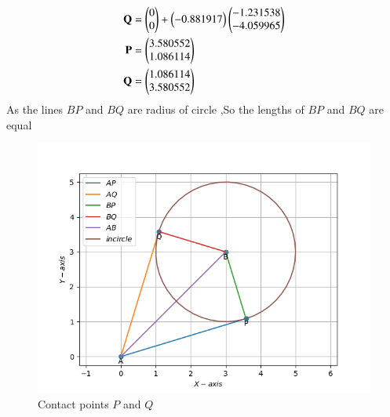\begin{enumerate}[label=\thesection.\arabic*,ref=\thesection.\theenumi]
\begin{enumerate}
\begin{align}
		\mathbf{Q} &=\begin{pmatrix}0 \\0\end{pmatrix}+\begin{pmatrix}-0.881917\end{pmatrix}\begin{pmatrix}-1.231538 \\ -4.059965\end{pmatrix} \\
		\mathbf{P} &=\begin{pmatrix} 3.580552\\ 1.086114\end{pmatrix} \\
		\mathbf{Q} &=\begin{pmatrix} 1.086114\\ 3.580552\end{pmatrix} 
	\end{align}
%
As the lines $BP$ and $BQ$ are radius of circle ,So the lengths of  $BP$ and $BQ$ are  equal 
\end{enumerate}
%
\begin{figure}[H]
    \centering
    \includegraphics[width=0.8\columnwidth]{figs/eigen.png}
    \caption{Contact points $P$ and $Q$}
    \label{fig:eigen}
\end{figure}

\end{enumerate}
